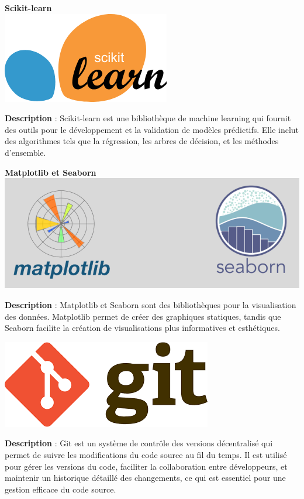 \begin{minipage}[t]{0.46\textwidth}
	\begin{center}
		\textbf{Scikit-learn}\\
		\includegraphics[width=0.6\linewidth]{images/logoSckitlearn}\\
	\end{center}
	\textbf{Description} : Scikit-learn est une bibliothèque de machine learning qui fournit des outils pour le développement et la validation de modèles prédictifs. Elle inclut des algorithmes tels que la régression, les arbres de décision, et les méthodes d'ensemble.
\end{minipage}
\hfill
\begin{minipage}[t]{0.46\textwidth}
	\begin{center}
		\textbf{Matplotlib et Seaborn} \\
		\includegraphics[width=0.7\linewidth]{images/logoMatplotlib&seaborn}
	\end{center}
	\textbf{Description} : Matplotlib et Seaborn sont des bibliothèques pour la visualisation des données. Matplotlib permet de créer des graphiques statiques, tandis que Seaborn facilite la création de visualisations plus informatives et esthétiques.
\end{minipage}

\vspace{3em}

\begin{minipage}[t]{1\textwidth}
	\begin{center}
		\includegraphics[width=0.23\linewidth]{images/logoGit}
	\end{center}
	\textbf{Description} : Git est un système de contrôle des versions décentralisé qui permet de suivre les modifications du code source au fil du temps. Il est utilisé pour gérer les versions du code, faciliter la collaboration entre développeurs, et maintenir un historique détaillé des changements, ce qui est essentiel pour une gestion efficace du code source.
\end{minipage}


